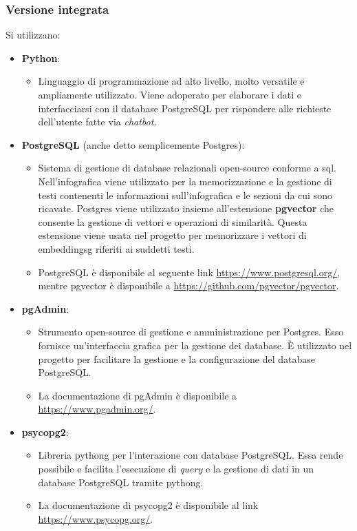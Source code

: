 \subsubsection{Versione integrata}
Si utilizzano:
\begin{itemize}
    \item \textbf{Python}:
    \begin{itemize}
        \item Linguaggio di programmazione ad alto livello, molto versatile e ampliamente utilizzato. Viene adoperato per elaborare i dati e interfacciarsi con il database PostgreSQL per rispondere alle richieste dell'utente fatte via \emph{chatbot}.
    \end{itemize}

    \item \textbf{PostgreSQL} (anche detto semplicemente Postgres):
    \begin{itemize}
        \item Sistema di gestione di database relazionali open-source conforme a \gls{sql}. Nell'infografica viene utilizzato per la memorizzazione e la gestione di testi contenenti le informazioni sull'infografica e le sezioni da cui sono ricavate.
        Postgres viene utilizzato insieme all'estensione \textbf{pgvector} che consente la gestione di vettori e operazioni di similarità. Questa estensione viene usata nel progetto per memorizzare i vettori di \gls{embeddingsg} riferiti ai suddetti testi. 
        \item PostgreSQL è disponibile al seguente link \href{https://www.postgresql.org/}{https://www.postgresql.org/}, mentre pgvector è disponibile a \href{https://github.com/pgvector/pgvector}{https://github.com/pgvector/pgvector}.
    \end{itemize}
    
    \item \textbf{pgAdmin}:
    \begin{itemize}
        \item Strumento open-source di gestione e amministrazione per Postgres. Esso fornisce un'interfaccia grafica per la gestione dei database. È utilizzato nel progetto per facilitare la gestione e la configurazione del database PostgreSQL.
        \item La documentazione di pgAdmin è disponibile a \href{https://www.pgadmin.org/}{https://www.pgadmin.org/}.
    \end{itemize}
    
    \item \textbf{psycopg2}:
    \begin{itemize}
        \item Libreria \gls{pythong} per l'interazione con database PostgreSQL. Essa rende possibile e facilita l'esecuzione di \emph{query} e la gestione di dati in un database PostgreSQL tramite \gls{pythong}.
        \item La documentazione di psycopg2 è disponibile al link \href{https://www.psycopg.org/}{https://www.psycopg.org/}.
    \end{itemize}
    

\end{itemize}
